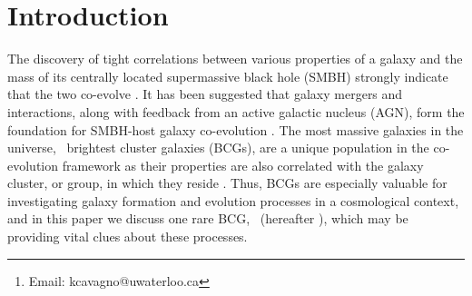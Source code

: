 \documentclass[useAMS,usenatbib]{mn2e}
\title[\mystitle]{\mytitle}
\author[Cavagnolo et al.]{K. W. Cavagnolo$^{1,2,3}$\thanks{Email:
    kcavagno@uwaterloo.ca}, M. Donahue$^{2}$, G. M. Voit$^{2}$,
  B. R. McNamara$^{1,4,5}$, and M. Sun$^{6}$\\
  $^{1}$University of Waterloo, Waterloo, ON, Canada.\\
  $^{2}$Michigan State University, East Lansing, MI, USA.\\
  $^{3}$Observatoire de la C\^ote d'Azur, Nice, PACA, France.\\
  $^{4}$Perimeter Institute for Theoretical Physics, Waterloo, ON, Canada.\\
  $^{5}$Harvard-Smithsonian Center for Astrophysics, Cambridge, MA, USA.\\
  $^{6}$University of Virginia, Charlottesville, VA, USA.}
\begin{document}
\date{Accepted (2010 Month Day). Received (2010 Month Day); in
  original form (2010 Month Day)}

\pagerange{\pageref{firstpage}--\pageref{lastpage}} 

\maketitle

\label{firstpage}


\begin{abstract}
  Using observations from the \chandra\ X-ray Observatory, we present
  a detailed study of the ultraluminous infrared brightest cluster
  galaxy \inine\ and the surrounding intracluster medium (ICM) of the
  host galaxy cluster \rxj. The X-ray data reveals ICM cavities formed
  by $\sim 10^{44} ~\lum$ jets from the $> 4 \times 10^{46} ~\lum$
  buried quasar in \inine, and excess X-ray emission near the core
  which is well-modeled as illumination of the ICM and a galactic
  nebula by the quasar. Consistent with previous studies, we show that
  the X-ray properties of the \inine\ nucleus are dominated by
  reflected emission from a quasar embedded in a moderately
  Compton-thick medium. Our interpretation of the observations suggest
  \inine\ may be a local example of how higher-redshift galaxies
  transition from a radiatively-dominated (\ie\ quasar-mode) to a
  mechanically-dominated (\ie\ radio-mode) form of feedback.
\end{abstract}


\begin{keywords}
  \mykeywords
\end{keywords}

\section{Introduction}
\label{sec:intro}

The discovery of tight correlations between various properties of a
galaxy and the mass of its centrally located supermassive black hole
(SMBH) strongly indicate that the two co-evolve
\citep[\eg][]{1995ARA&A..33..581K, magorrian, 2000ApJ...539L...9F,
  2000ApJ...539L..13G, 2001ApJ...563L..11G}. It has been suggested
that galaxy mergers and interactions, along with feedback from an
active galactic nucleus (AGN), form the foundation for SMBH-host
galaxy co-evolution \citep[\eg][]{1995MNRAS.276..663B,
  1998A&A...331L...1S, 2000MNRAS.311..576K, 2001MNRAS.324..757G}. The
most massive galaxies in the universe, \eg\ brightest cluster galaxies
(BCGs), are a unique population in the co-evolution framework as their
properties are also correlated with the galaxy cluster, or group, in
which they reside \citep[\eg][]{1984ApJ...276...38J,
  1998ApJ...502..141D}. Thus, BCGs are especially valuable for
investigating galaxy formation and evolution processes in a
cosmological context, and in this paper we discuss one rare BCG,
\inine\ (hereafter \irs), which may be providing vital clues about
these processes.
\end{document}

